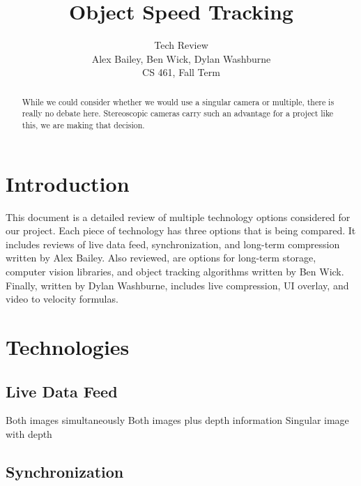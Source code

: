 \documentclass[letterpaper,10pt,onecolumn,draftclsnofoot]{IEEEtran}
\title{Object Speed Tracking}
\author{Tech Review\\Alex Bailey, Ben Wick, Dylan Washburne\\CS 461, Fall Term}
\begin{document}
\begin{titlepage}

\maketitle

\begin{abstract}
While we could consider whether we would use a singular camera or multiple, there is really no debate here.
Stereoscopic cameras carry such an advantage for a project like this, we are making that decision.
 
\end{abstract}

\end{titlepage}

\tableofcontents
\newpage

\section{Introduction}
This document is a detailed review of multiple technology options considered for our project. Each piece of technology has three options that is being compared. It includes reviews of live data feed, synchronization, and long-term compression written by Alex Bailey. Also reviewed, are options for long-term storage, computer vision libraries, and object tracking algorithms written by Ben Wick. Finally, written by Dylan Washburne, includes live compression, UI overlay, and video to velocity formulas.

\section{Technologies}

\subsection{Live Data Feed} %

Both images simultaneously
Both images plus depth information
Singular image with depth

\newpage
\subsection{Synchronization} %

\end{document}
